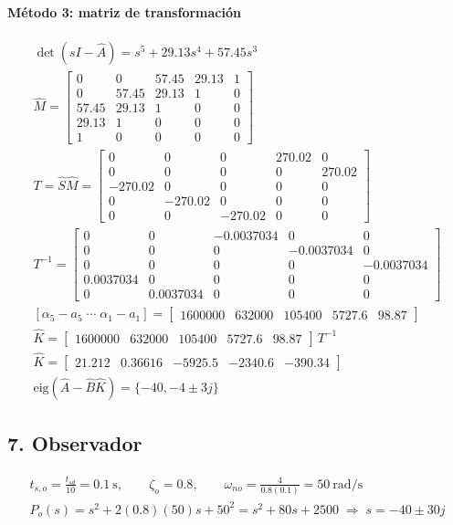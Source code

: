 \documentclass[11pt]{article}
\begin{document}
\paragraph{Método 3: matriz de transformación}
\begin{gather*}
\det(sI-\hat{A})=s^{5} + 29.13s^{4} + 57.45s^{3}\\
\hat{M}=\begin{bmatrix}0 & 0 & 57.45 & 29.13 & 1 \\ 0 & 57.45 & 29.13 & 1 & 0 \\ 57.45 & 29.13 & 1 & 0 & 0 \\ 29.13 & 1 & 0 & 0 & 0 \\ 1 & 0 & 0 & 0 & 0\end{bmatrix}\\
T=\hat{S}\hat{M}=\begin{bmatrix}0 & 0 & 0 & 270.02 & 0 \\ 0 & 0 & 0 & 0 & 270.02 \\ -270.02 & 0 & 0 & 0 & 0 \\ 0 & -270.02 & 0 & 0 & 0 \\ 0 & 0 & -270.02 & 0 & 0\end{bmatrix}\\
T^{-1}=\begin{bmatrix}0 & 0 & -0.0037034 & 0 & 0 \\ 0 & 0 & 0 & -0.0037034 & 0 \\ 0 & 0 & 0 & 0 & -0.0037034 \\ 0.0037034 & 0 & 0 & 0 & 0 \\ 0 & 0.0037034 & 0 & 0 & 0\end{bmatrix}\\
[\alpha_5-a_5\;\cdots\;\alpha_1-a_1]=\begin{bmatrix}1600000 & 632000 & 105400 & 5727.6 & 98.87\end{bmatrix}\\
\hat{K}=\begin{bmatrix}1600000 & 632000 & 105400 & 5727.6 & 98.87\end{bmatrix}\,T^{-1}\\
\hat{K}=\begin{bmatrix}21.212 & 0.36616 & -5925.5 & -2340.6 & -390.34\end{bmatrix}\\
\text{eig}(\hat{A}-\hat{B}\hat{K})=\{-40, -4\pm3j\}
\end{gather*}
\subsection*{7. Observador}
\begin{gather*}
t_{s,o}=\frac{t_{sd}}{10}=0.1~\text{s},\qquad \zeta_o=0.8,\qquad \omega_{no}=\frac{4}{0.8(0.1)}=50~\text{rad/s}\\
P_o(s)=s^2+2(0.8)(50)s+50^2=s^2+80s+2500\;\Rightarrow\; s=-40\pm30j
\end{gather*}
\end{document}
